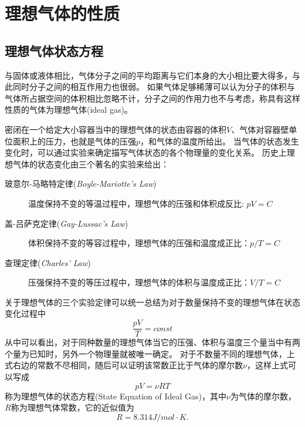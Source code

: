 \section{理想气体的性质}
\subsection{理想气体状态方程}
与固体或液体相比，气体分子之间的平均距离与它们本身的大小相比要大得多，与此同时分子之间的相互作用力也很弱。
如果气体足够稀薄可以认为分子的体积与气体所占据空间的体积相比忽略不计，分子之间的作用力也不与考虑，称具有这样性质的气体为{\heiti 理想气体}(ideal gas)。

密闭在一个给定大小容器当中的理想气体的状态由容器的体积$V$、气体对容器壁单位面积上的压力，也就是气体的压强$p$，和气体的温度所给出。
当气体的状态发生变化时，可以通过实验来确定描写气体状态的各个物理量的变化关系。
历史上理想气体的状态变化由三个著名的实验来给出：
\begin{description}
\item[{\heiti 玻意尔-马略特定律}(\textit{Boyle-Mariotte's Law})] \quad \par 温度保持不变的等温过程中，理想气体的压强和体积成反比: $pV = C$
\item[{\heiti 盖-吕萨克定律}(\textit{Gay-Lussac's Law})] \quad \par 体积保持不变的等容过程中，理想气体的压强和温度成正比：$p/T=C$
\item[{\heiti 查理定律}(\textit{Charles' Law})] \quad \par 压强保持不变的等压过程中，理想气体的体积与温度成正比：$V/T=C$
\end{description}


\quad\par
关于理想气体的三个实验定律可以统一总结为对于数量保持不变的理想气体在状态变化过程中
\begin{equation}
\frac{pV}{T}=const
\end{equation}
从中可以看出，对于同种数量的理想气体当它的压强、体积与温度三个量当中有两个量为已知时，另外一个物理量就被唯一确定。
对于不数量不同的理想气体，上式右边的常数不尽相同，随后可以证明该常数正比于气体的摩尔数$\nu$，这样上式可以写成
\begin{equation}\label{eqn: thermol 理想气体状态方程}
pV = \nu RT
\end{equation}
称为{\heiti 理想气体的状态方程}(State Equation of Ideal Gas)，其中$\nu$为气体的摩尔数，$R$称为理想气体常数，它的近似值为
\begin{equation}\label{key}
R = 8.314\si{J/mol \cdot K}.
\end{equation}

